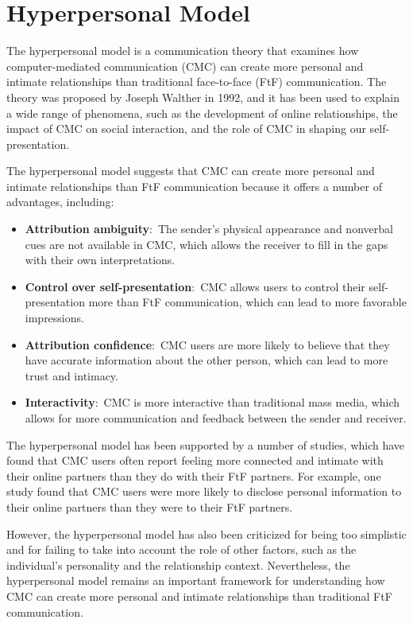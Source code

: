 \documentclass[
  b5paper]{book}
\begin{document}
\hypertarget{hyperpersonal-model}{%
\section{Hyperpersonal Model}\label{hyperpersonal-model}}

The hyperpersonal model is a communication theory that examines how computer-mediated communication (CMC) can create more personal and intimate relationships than traditional face-to-face (FtF) communication. The theory was proposed by Joseph Walther in 1992, and it has been used to explain a wide range of phenomena, such as the development of online relationships, the impact of CMC on social interaction, and the role of CMC in shaping our self-presentation.

The hyperpersonal model suggests that CMC can create more personal and intimate relationships than FtF communication because it offers a number of advantages, including:

\begin{itemize}
\item
  \textbf{Attribution ambiguity}:~The sender's physical appearance and nonverbal cues are not available in CMC, which allows the receiver to fill in the gaps with their own interpretations.
\item
  \textbf{Control over self-presentation}:~CMC allows users to control their self-presentation more than FtF communication, which can lead to more favorable impressions.
\item
  \textbf{Attribution confidence}:~CMC users are more likely to believe that they have accurate information about the other person, which can lead to more trust and intimacy.
\item
  \textbf{Interactivity}:~CMC is more interactive than traditional mass media, which allows for more communication and feedback between the sender and receiver.
\end{itemize}

The hyperpersonal model has been supported by a number of studies, which have found that CMC users often report feeling more connected and intimate with their online partners than they do with their FtF partners. For example, one study found that CMC users were more likely to disclose personal information to their online partners than they were to their FtF partners.

However, the hyperpersonal model has also been criticized for being too simplistic and for failing to take into account the role of other factors, such as the individual's personality and the relationship context. Nevertheless, the hyperpersonal model remains an important framework for understanding how CMC can create more personal and intimate relationships than traditional FtF communication.
\end{document}
